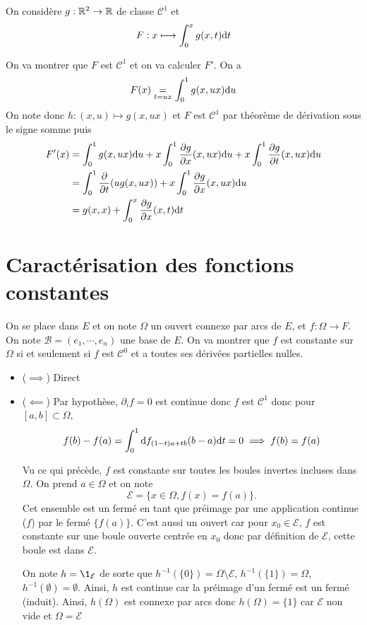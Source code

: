On considère $g:\mathbb R^2\to \mathbb R$ de classe $\mathcal C^1$ et \[
    F:x\longmapsto \int_0^xg(x, t)\mathrm{d} t
\]

On va montrer que $F$ est $\mathcal C^1$ et on va calculer $F'$.
On a \[
    F(x) \underset{t=ux}=\int_0^1g(x, ux)\mathrm{d} u
\]
On note donc $h: (x, u) \longmapsto g(x, ux)$ et $F$ est $\mathcal C^1$ par théorème de dérivation sous le signe somme puis \begin{align*}
    F'(x)&=\int_0^1 g(x, ux)\mathrm{d} u+x\int_0^1\frac{\partial g}{\partial x}(x, ux)\mathrm{d} u+x\int_0^1\frac{\partial g}{\partial t}(x, ux)\mathrm{d} u \\
         &= \int_0^1\frac{\partial}{\partial t}(ug(x, ux))+x\int_0^1 \frac{\partial g}{\partial x} (x, ux)\mathrm{d} u \\ &= g(x, x)+\int_0^x \frac{\partial g}{\partial x}(x, t)\mathrm{d} t
\end{align*}

\section{Caractérisation des fonctions constantes}

On se place dans $E$ et on note $\Omega$ un ouvert connexe par arcs de $E$, et $f:\Omega \to F$. On note $\mathcal B=(e_1, \cdots, e_n)$ une base de $E$. On va montrer que $f$ est constante sur $\Omega$ si et seulement si $f$ est $\mathcal C^0$ et a toutes ses dérivées partielles nulles.

\begin{itemize}
    \item ($\implies$) Direct
    \item ($\impliedby$) Par hypothèse, $\partial_if =0$ est continue donc $f$ est $\mathcal C^1$ donc pour $[a, b]\subset \Omega$, \[
            f(b)-f(a)=\int_0^1\mathrm{d} f_{(1-t)a+tb}(b-a)\mathrm{d} t=0\implies f(b)=f(a)
        \]

        Vu ce qui précède, $f$ est constante sur toutes les boules invertes incluses dans $\Omega$. On prend $a\in\Omega$ et on note \[
            \mathcal E=\{x\in\Omega, f(x)=f(a)\}.
        \]
        Cet ensemble est un fermé en tant que préimage par une application continue ($f$) par le fermé $\{f(a)\}$. C'est aussi un ouvert car pour $x_0\in\mathcal E$, $f$ est constante sur une boule ouverte centrée en $x_0$ donc par définition de $\mathcal E$, cette boule est dans $\mathcal E$.

        On note $h=\1_{\mathcal E}$ de sorte que $h^{-1}(\{0\})=\Omega\setminus \mathcal E$, $h^{-1}(\{1\})=\Omega$, $h^{-1}(\emptyset)=\emptyset$. Ainsi, $h$ est continue car la préimage d'un fermé est un fermé (induit). Ainsi, $h(\Omega)$ est connexe par arcs donc $h(\Omega)=\{1\}$ car $\mathcal E$ non vide et $\Omega=\mathcal E$
\end{itemize}


